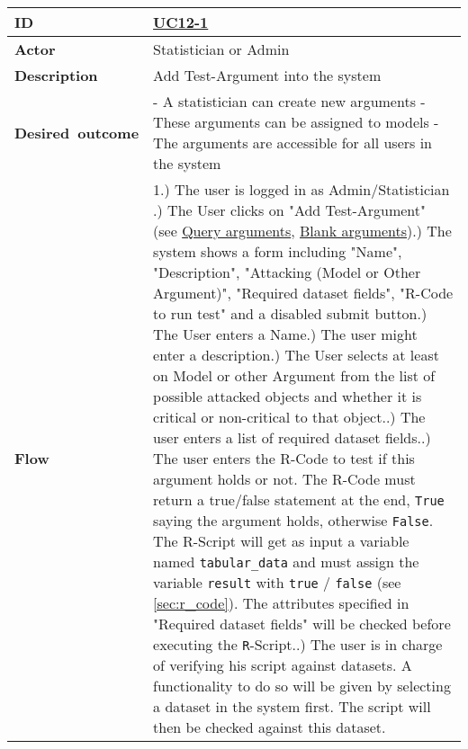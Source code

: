 { \tiny
	\begin{longtable}{|p{2cm} p{11cm}|}
		\hline
			\textbf{ID} & 
				\href{https://trello.com/c/2V6Cl65u}{UC12-1}\\
			
			\hline
			\textbf{Actor} & Statistician or Admin \\
			\hline
			\textbf{Description} & 
				Add Test-Argument into the system\\
			\hline
			\textbf{Desired~outcome} & 
				- A statistician can create new arguments \newline
				- These arguments can be assigned to models \newline
				- The arguments are accessible for all users in the system \newline
		\\
		\hline
			\textbf{Flow} & 
				1.) The user is logged in as Admin/Statistician  \newline
				2.) The User clicks on "Add Test-Argument" (see \href{https://trello.com/c/OwM2Z7wt}{Query arguments}, \href{https://trello.com/c/Rg6GPnNE/39-uc12-5-add-attacks-between-arguments}{Blank arguments})\newline
				3.) The system shows a form including "Name", "Description", "Attacking (Model or Other Argument)", "Required dataset fields", "R-Code to run test" and a disabled submit button\newline
				4.) The User enters a Name\newline
				5.) The user might enter a description\newline
				6.) The User selects at least on Model or other Argument from the list of possible attacked objects and whether it is critical or non-critical to that object.\newline
				7.) The user enters a list of required dataset fields.\newline
				8.) The user enters the R-Code to test if this argument holds or not. The R-Code must return a true/false statement at the end, \texttt{True} saying the argument holds, otherwise \texttt{False}. The R-Script will get as input a variable named \texttt{tabular\_data}  and must assign the variable \texttt{result} with \texttt{true} / \texttt{false} (see \autoref{sec:r_code}). The attributes specified in "Required dataset fields" will be checked before executing the \texttt{R}-Script.\newline
				9.) The user is in charge of verifying his script against datasets. A functionality to do so will be given by selecting a dataset in the system first. The script will then be checked against this dataset.\newline

\end{longtable}}
